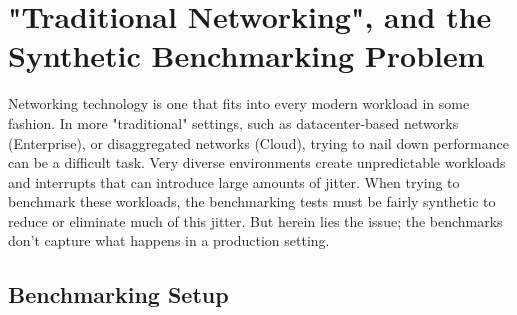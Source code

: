 \documentclass[letterpaper]{article}
\begin{document}
\section{"Traditional Networking", and the Synthetic Benchmarking Problem}
Networking technology is one that fits into every modern workload in some fashion. In more "traditional" settings, such as datacenter-based networks (Enterprise), or disaggregated networks (Cloud), trying to nail down performance can be a difficult task. Very diverse environments create unpredictable workloads and interrupts that can introduce large amounts of jitter. When trying to benchmark these workloads, the benchmarking tests must be fairly synthetic to reduce or eliminate much of this jitter. But herein lies the issue; the benchmarks don't capture what happens in a production setting.
\subsection{Benchmarking Setup}
\end{document}
